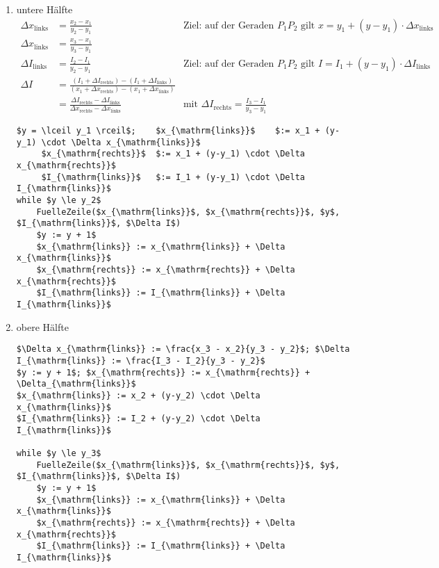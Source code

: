 		\begin{enumerate}
		 \item untere Hälfte
			\begin{align*}
			 \Delta x_{\mathrm{links}} &= \frac{x_2-x_1}{y_2-y_1} &
				\text{Ziel: auf der Geraden $P_1P_2$ gilt $x = y_1 + (y-y_1)\cdot \Delta x_{\mathrm{links}}$}\\
			 \Delta x_{\mathrm{links}} &= \frac{x_3-x_1}{y_3-y_1}\\
			 \Delta I_{\mathrm{links}} &= \frac{I_2-I_1}{y_2-y_1} &
				\text{Ziel: auf der Geraden $P_1P_2$ gilt $I = I_1 + (y-y_1)\cdot \Delta I_{\mathrm{links}}$}\\
			 \Delta I &= \frac{
					(I_1 + \Delta I_{\mathrm{rechts}})-(I_1 + \Delta I_{\mathrm{links}})
					}{
					(x_1 + \Delta x_{\mathrm{rechts}})-(x_1 + \Delta x_{\mathrm{links}})
					}\\
				  &= \boxed{\frac{\Delta I_{\mathrm{rechts}}-\Delta I_{\mathrm{links}}}
					{\Delta x_{\mathrm{rechts}}-\Delta x_{\mathrm{links}}}} &
						\text{mit $\Delta I_{\mathrm{rechts}} = \frac{I_3 - I_1}{y_3 - y_1}$}
			\end{align*}
			\begin{lstlisting}[mathescape=true]
$y = \lceil y_1 \rceil$;	$x_{\mathrm{links}}$	$:= x_1 + (y-y_1) \cdot \Delta x_{\mathrm{links}}$
	 $x_{\mathrm{rechts}}$	$:= x_1 + (y-y_1) \cdot \Delta x_{\mathrm{rechts}}$
	 $I_{\mathrm{links}}$	$:= I_1 + (y-y_1) \cdot \Delta I_{\mathrm{links}}$
while $y \le y_2$
	FuelleZeile($x_{\mathrm{links}}$, $x_{\mathrm{rechts}}$, $y$, $I_{\mathrm{links}}$, $\Delta I$)
	$y := y + 1$
	$x_{\mathrm{links}} := x_{\mathrm{links}} + \Delta x_{\mathrm{links}}$
	$x_{\mathrm{rechts}} := x_{\mathrm{rechts}} + \Delta x_{\mathrm{rechts}}$
	$I_{\mathrm{links}} := I_{\mathrm{links}} + \Delta I_{\mathrm{links}}$
			\end{lstlisting}
		 \item obere Hälfte
			\begin{lstlisting}[mathescape=true]
$\Delta x_{\mathrm{links}} := \frac{x_3 - x_2}{y_3 - y_2}$; $\Delta I_{\mathrm{links}} := \frac{I_3 - I_2}{y_3 - y_2}$
$y := y + 1$; $x_{\mathrm{rechts}} := x_{\mathrm{rechts}} + \Delta_{\mathrm{links}}$
$x_{\mathrm{links}} := x_2 + (y-y_2) \cdot \Delta x_{\mathrm{links}}$
$I_{\mathrm{links}} := I_2 + (y-y_2) \cdot \Delta I_{\mathrm{links}}$

while $y \le y_3$
	FuelleZeile($x_{\mathrm{links}}$, $x_{\mathrm{rechts}}$, $y$, $I_{\mathrm{links}}$, $\Delta I$)
	$y := y + 1$
	$x_{\mathrm{links}} := x_{\mathrm{links}} + \Delta x_{\mathrm{links}}$
	$x_{\mathrm{rechts}} := x_{\mathrm{rechts}} + \Delta x_{\mathrm{rechts}}$
	$I_{\mathrm{links}} := I_{\mathrm{links}} + \Delta I_{\mathrm{links}}$
			\end{lstlisting}
		\end{enumerate}
